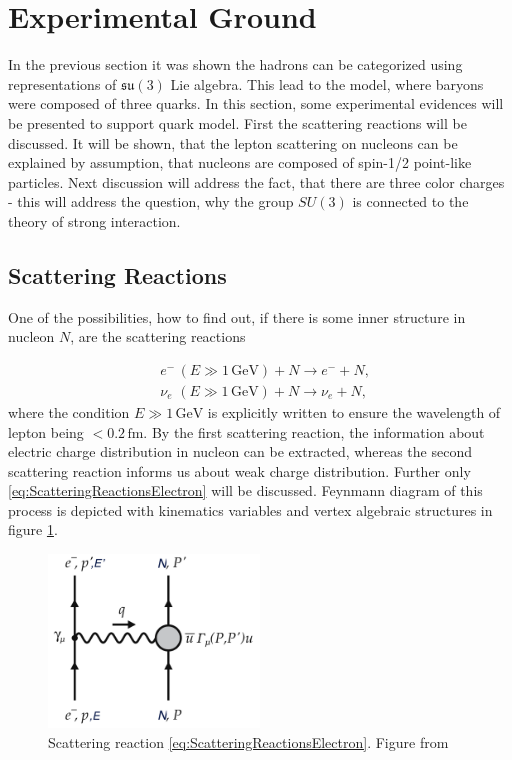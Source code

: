 \documentclass[a4paper,11pt]{report}
\newcommand{\GeV}{\,\text{GeV}}
\begin{document}
\section{Experimental Ground}

In the previous section it was shown the hadrons can be categorized using
representations of $\mathfrak{su}(3)$ Lie algebra. This lead to the model, where
baryons were composed of three quarks. In this section, some experimental
evidences will be presented to support quark model. First the scattering
reactions will be discussed. It will be shown, that the lepton scattering on
nucleons can be explained by assumption, that nucleons are composed of spin-1/2
point-like particles. Next discussion will address the fact, that there are
three color charges - this will address the question, why the group $SU(3)$ is
connected to the theory of strong interaction.

\subsection{Scattering Reactions}

One of the possibilities, how to find out, if there is some inner structure in
nucleon $N$, are the scattering reactions

\begin{align}
  &e^- \, (E \gg 1\GeV) + N \rightarrow e^- + N,
  \label{eq:ScatteringReactionsElectron} \\
  &\nu_e \,\, (E \gg 1\GeV) + N \rightarrow \nu_e + N,
  \label{eq:ScatteringReactionsNeutrino}
\end{align}
where the condition $E \gg 1 \GeV$ is explicitly written to ensure the wavelength
of lepton being $< 0.2\,\text{fm}$. By the first scattering reaction, the information
about electric charge distribution in nucleon can be extracted, whereas the
second scattering reaction informs us about weak charge distribution. Further only
\eqref{eq:ScatteringReactionsElectron} will be discussed. Feynmann diagram of this
process is depicted with kinematics variables and vertex algebraic structures 
in figure \ref{fig:Scattering}. 

\begin{figure}[t]
  \centering
  \includegraphics[width=0.5\textwidth]{Chapter1/Scattering.png} 
  \caption{Scattering reaction \eqref{eq:ScatteringReactionsElectron}. Figure from
    \cite{QCDTextbook}}
  \label{fig:Scattering}
\end{figure}
\end{document}
